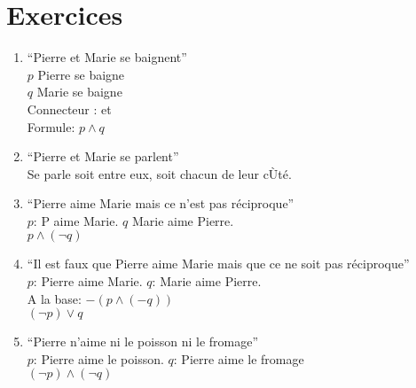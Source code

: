 \section{Exercices}
\begin{enumerate}
	\item ``Pierre et Marie se baignent''\\
		$p$ Pierre se baigne\\
		$q$ Marie se baigne \\
		Connecteur : et\\
		Formule: $p \land q$
	\item ``Pierre et Marie se parlent''\\
		Se parle soit entre eux, soit chacun de leur cÙté.
	\item ``Pierre aime Marie mais ce n'est pas réciproque''\\
		$p$: P aime Marie.
		$q$ Marie aime Pierre.\\
		$p \land (\lnot q)$
	\item ``Il est faux que Pierre aime Marie mais que ce ne soit pas réciproque'' \\
		$p$: Pierre aime Marie.
		$q$: Marie aime Pierre.\\
		A la base: $-(p \land (-q))$\\
		$(\lnot p) \lor q$
	\item ``Pierre n'aime ni le poisson ni le fromage''\\
		$p$: Pierre aime le poisson.
		$q$: Pierre aime le fromage\\
		$(\lnot p) \land (\lnot q)$
\end{enumerate}

